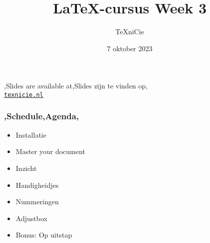 \documentclass[
    dutch,
    everyoneauthor=true,
    defaultSlideCollection=vincent,
]{../../cursuspresentatie}
\title[\LaTeX{}-cursus Week 3]{\LaTeX{}-cursus Week 3}
\author{\TeX niCie}
\date{7 oktober 2023}
\begin{document}

\begin{frame}
    \titlepage
    \centering

    {\Large\lang,Slides are available at,Slides zijn te vinden op,\\
    \href{https://texnicie.nl}{\ul{\texttt{texnicie.nl}}}}
\end{frame}

\setul{1pt}{2pt}

\begin{frame}
    \frametitle{\lang,Schedule,Agenda,}
    
    \begin{itemize}[label=\textbullet]
	\item Installatie
        \item Master your document
        \item Inzicht
        \item Handigheidjes
        \item Nummeringen
        \item Adjustbox
        \item Bonus: Op uitstap
    \end{itemize}
\end{frame}
\end{document}
